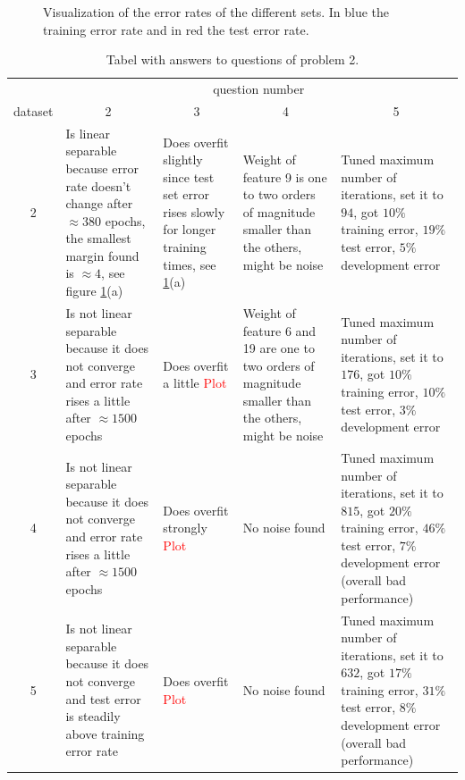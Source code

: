 \documentclass[12pt]{article}
\begin{document}
\begin{figure}[b!]
	\hfill
	\caption[]{Visualization of the error rates of the different sets. In blue the training error rate and in red the test error rate. }
	\label{fig:2.1}
\end{figure}

\begin{table}[h!]
	\centering
	\begin{tabularx}{\textwidth}{c|X|X|X|X|}
		& \multicolumn{4}{c|}{question number} \\
		dataset & \multicolumn{1}{c}{2} & \multicolumn{1}{c}{3} & \multicolumn{1}{c}{4} & \multicolumn{1}{c|}{5} \\
		\midrule
		2     &   Is linear separable because error rate doesn't change after $\approx 380$ epochs, the smallest margin found is $\approx 4$, see figure \ref{fig:2.1}(a)  &  Does overfit slightly since test set error rises slowly for longer training times, see \ref{fig:2.1}(a)      &   Weight of feature 9 is one to two orders of magnitude smaller than the others, might be noise  & Tuned maximum number of iterations, set it to $94$, got $10\%$ training error, $19\%$ test error, $5\%$ development error \\
		\midrule
		3     &   Is not linear separable because it does not converge and error rate rises a little after $\approx 1500$ epochs    &    Does overfit a little \textcolor{red}{Plot}   &   Weight of feature 6 and 19 are one to two orders of magnitude smaller than the others, might be noise    & Tuned maximum number of iterations, set it to $176$, got $10\%$ training error, $10\%$ test error, $3\%$ development error \\
		\midrule
		4     &   Is not linear separable because it does not converge and error rate rises a little after $\approx 1500$ epochs    &    Does overfit strongly \textcolor{red}{Plot}   &   No noise found    & Tuned maximum number of iterations, set it to $815$, got $20\%$ training error, $46\%$ test error, $7\%$ development error (overall bad performance) \\
		\midrule
		5     &   Is not linear separable because it does not converge and test error is steadily above training error rate     &    Does overfit \textcolor{red}{Plot}   &   No noise found    & Tuned maximum number of iterations, set it to $632$, got $17\%$ training error, $31\%$ test error, $8\%$ development error (overall bad performance) \\
		\bottomrule
	\end{tabularx}%
	\caption{Tabel with answers to questions of problem 2.}
	\label{tab:1}%
\end{table}%
\end{document}
